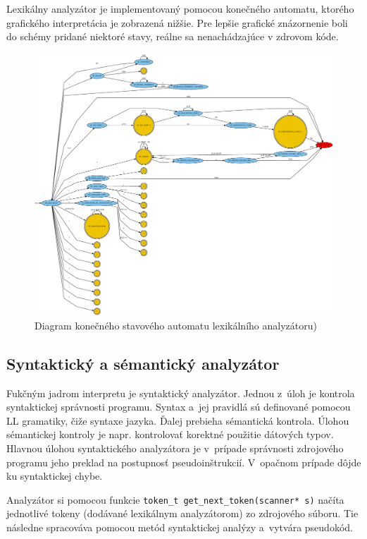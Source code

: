 \documentclass[12pt,a4paper,titlepage,final]{article}
\begin{document}
Lexikálny analyzátor je implementovaný pomocou konečného automatu, ktorého grafického
interpretácia je zobrazená nižšie. Pre lepšie grafické znázornenie boli do schémy pridané niektoré
stavy, reálne sa nenachádzajúce v zdrovom kóde.

\begin{figure}[]
  \centering
  \includegraphics[scale=0.25]{img/fsm.eps}
  \caption{Diagram konečného stavového automatu lexikálního analyzátoru)}
  \label{fig:fsm}
\end{figure}

\subsection{Syntaktický a sémantický analyzátor}

Fukčným jadrom interpretu je syntaktický analyzátor. Jednou z úloh je kontrola syntaktickej správnosti programu. Syntax a jej pravidlá sú definované pomocou LL gramatiky, čiže syntaxe jazyka. Ďalej prebieha sémantická kontrola. Úlohou sémantickej kontroly je napr. kontrolovať korektné použitie dátových typov. Hlavnou úlohou syntaktického analyzátora je v prípade správnosti zdrojového programu jeho preklad na postupnosť pseudoinštrukcií. V opačnom prípade dôjde ku syntaktickej chybe.

Analyzátor si pomocou funkcie \verb+token_t get_next_token(scanner* s)+ načíta jednotlivé tokeny (dodávané lexikálnym analyzátorom) zo zdrojového súboru. Tie následne spracováva pomocou metód syntaktickej analýzy a vytvára pseudokód.
\end{document}
